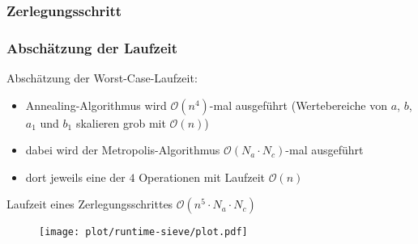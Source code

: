 \begin{frame}
  \frametitle{Zerlegungsschritt}
  
\end{frame}

\begin{frame}[allowframebreaks]
  \frametitle{Abschätzung der Laufzeit}
  Abschätzung der Worst-Case-Laufzeit:
  \begin{itemize}
    \item Annealing-Algorithmus wird $\mathcal{O}\left(n^4\right)$-mal ausgeführt (Wertebereiche von $a$, $b$, $a_1$ und $b_1$ skalieren grob mit $\mathcal{O}\left(n\right)$)
    \item dabei wird der Metropolis-Algorithmus $\mathcal{O}\left(N_a\cdot N_c\right)$-mal ausgeführt
    \item dort jeweils eine der $4$ Operationen mit Laufzeit $\mathcal{O}\left(n\right)$
  \end{itemize}
  \Rightarrow{} Laufzeit eines Zerlegungsschrittes $\mathcal{O}\left(n^5\cdot N_a\cdot N_c\right)$
  \pause{}
  \begin{figure}[H]
    \centering
    \texttt{[image: plot/runtime-sieve/plot.pdf]}
  \end{figure}
\end{frame}
